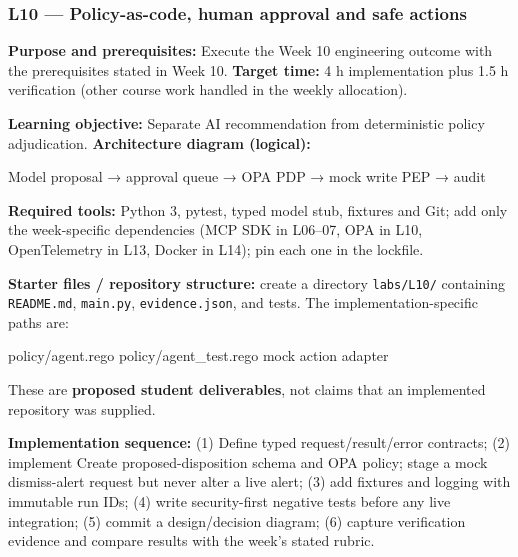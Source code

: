 \documentclass[
  10pt,
]{article}
\newenvironment{Shaded}{\begin{snugshade}}{\end{snugshade}}
\newcommand{\NormalTok}[1]{#1}
\begin{document}
\subsubsection{L10 --- Policy-as-code, human approval and safe
actions}\label{l10-policy-as-code-human-approval-and-safe-actions}

\textbf{Purpose and prerequisites:} Execute the Week 10 engineering
outcome with the prerequisites stated in Week 10. \textbf{Target time:}
4 h implementation plus 1.5 h verification (other course work handled in
the weekly allocation).

\textbf{Learning objective:} Separate AI recommendation from
deterministic policy adjudication. \textbf{Architecture diagram
(logical):}

\begin{Shaded}
\begin{Highlighting}[]
\NormalTok{Model proposal → approval queue → OPA PDP → mock write}
\NormalTok{PEP → audit}
\end{Highlighting}
\end{Shaded}

\textbf{Required tools:} Python 3, pytest, typed model stub, fixtures
and Git; add only the week-specific dependencies (MCP SDK in L06--07,
OPA in L10, OpenTelemetry in L13, Docker in L14); pin each one in the
lockfile.

{\raggedright \textbf{Starter files / repository structure:} create a directory
\texttt{labs/\allowbreak L10/} containing \texttt{README.md}, \texttt{main.py},
\texttt{evidence.json}, and tests. The implementation-specific paths
are:\par}

\begin{Shaded}
\begin{Highlighting}[]
\NormalTok{policy/agent.rego}
\NormalTok{policy/agent\_test.rego}
\NormalTok{mock action adapter}
\end{Highlighting}
\end{Shaded}

These are \textbf{proposed student deliverables}, not claims that an
implemented repository was supplied.

{\raggedright \textbf{Implementation sequence:} (1) Define typed request/\allowbreak result/\allowbreak error
contracts; (2) implement Create proposed-disposition schema and OPA
policy; stage a mock dismiss-alert request but never alter a live alert;
(3) add fixtures and logging with immutable run IDs; (4) write
security-first negative tests before any live integration; (5) commit a
design/\allowbreak decision diagram; (6) capture verification evidence and compare
results with the week's stated rubric.\par}
\end{document}
